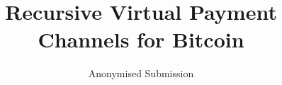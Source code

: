 \title{Recursive Virtual Payment Channels for Bitcoin}

\author{Anonymised Submission}
\institute{}

%

